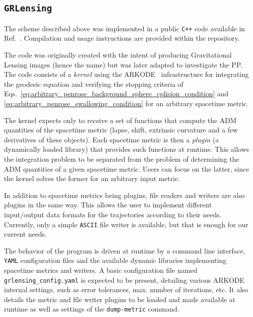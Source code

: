 \subsection{\texttt{GRLensing}}

The scheme described above was implemented in a public \texttt{C++} code available in Ref.~\cite{GRLensingRepo}. Compilation and usage instructions are provided within the repository.

The code was originally created with the intent of producing Gravitational Lensing images (hence the name) but was later adapted to investigate the \ac{PP}. The code consists of a \emph{kernel} using the ARKODE~\cite{ARKODE} infrastructure for integrating the geodesic equation and verifying the stopping criteria of Eqs.~\eqref{eq:arbitrary_penrose_background_sphere_cplision_condition} and \eqref{eq:arbitrary_penrose_swallowing_condition} for an arbitrary spacetime metric.

The kernel expects only to receive a set of functions that compute the \ac{ADM} quantities of the spacetime metric (lapse, shift, extrinsic curvature and a few derivatives of these objects). Each spacetime metric is then a \emph{plugin} (a dynamically loaded library) that provides such functions at runtime. This allows the integration problem to be separated from the problem of determining the \ac{ADM} quantities of a given spacetime metric. Users can focus on the latter, since the kernel solves the former for an arbitrary input metric. 

In addition to spacetime metrics being plugins, file readers and writers are also plugins in the same way. This allows the user to implement different input/output data formats for the trajectories according to their needs. Currently, only a simple \texttt{ASCII} file writer is available, but that is enough for our current needs.

The behavior of the program is driven at runtime by a command line interface, \texttt{YAML} configuration files and the available dynamic libraries implementing spacetime metrics and writers. A basic configuration file named \texttt{grlensing\_config.yaml} is expected to be present, detailing various ARKODE internal settings, such as error tolerances, max. number of iterations, etc. It also details the metric and file writer plugins to be loaded and made available at runtime as well as settings of the \texttt{dump-metric} command. 


